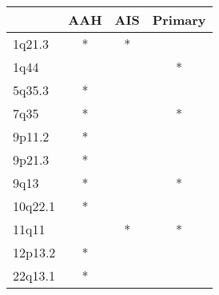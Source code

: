 \begin{tabular}{lccc}
\toprule
{} & AAH & AIS & Primary \\
\midrule
1q21.3  &   * &   * &         \\
1q44    &     &     &       * \\
5q35.3  &   * &     &         \\
7q35    &   * &     &       * \\
9p11.2  &   * &     &         \\
9p21.3  &   * &     &         \\
9q13    &   * &     &       * \\
10q22.1 &   * &     &         \\
11q11   &     &   * &       * \\
12p13.2 &   * &     &         \\
22q13.1 &   * &     &         \\
\bottomrule
\end{tabular}
